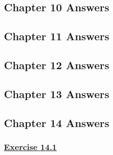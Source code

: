 \documentclass[
  11pt,
  openany]{book}
\begin{document}
\newpage

\newpage

\subsection*{Chapter 10 Answers}\label{chapter-10-answers}

\newpage

\newpage

\subsection*{Chapter 11 Answers}\label{chapter-11-answers}

\newpage

\newpage

\subsection*{Chapter 12 Answers}\label{chapter-12-answers}

\newpage

\newpage

\subsection*{Chapter 13 Answers}\label{chapter-13-answers}

\newpage

\newpage

\subsection*{Chapter 14 Answers}\label{chapter-14-answers}

\vspace{-0.2cm}

\begingroup
\footnotesize

\vspace{-0.2cm}

\label{ex141a}{}

\subsubsection*{\texorpdfstring{\hyperref[ex141q]{Exercise 14.1}}{Exercise 14.1}}\label{exercise-14.1-1}
\end{document}
